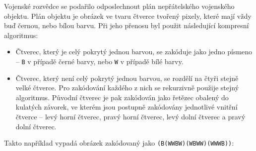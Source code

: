 
\usepackage{pgf,tikz}





Vojenské rozvědce se podařilo odposlechnout plán nepřátelského vojenského
objektu. Plán objektu je obrázek ve tvaru čtverce tvořený pixely, které mají
vždy buď černou, nebo bílou barvu. Při jeho přenosu byl použit následující
kompresní algoritmus:

\begin{itemize}[nolistsep]

\item Čtverec, který je celý pokrytý jednou barvou, se zakóduje jako jedno
  písmeno -- \texttt{B} v případě černé barvy, nebo \texttt{W} v případě bílé
  barvy.

\item Čtverec, který není celý pokrytý jednou barvou, se rozdělí na čtyři stejně
  velké čtverce. Pro zakódování každého z nich se rekurzivně použije stejný
  algoritmus. Původní čtverec je pak zakódován jako řetězec obalený do kulatých
  závorek, ve kterém jsou postupně zakódovány jednotlivé vnitřní čtverce -- levý
  horní čtverec, pravý horní čtverec, levý dolní čtverec a pravý dolní čtverec.

\end{itemize}

Takto například vypadá obrázek zakódovaný jako \texttt{(B(WWBW)(WBWW)(WWWB))}:

\begin{center}
\end{center}

